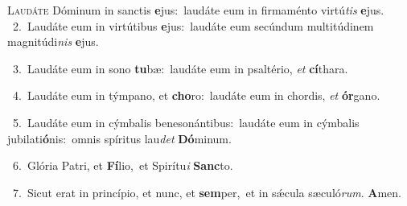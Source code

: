 \lettrine{\initial\textcolor{\initialcolor}{L}}{audáte} Dóminum in sanctis \textbf{e}\-jus:~\star laudáte eum in firmaménto virtú\textit{tis} \textbf{e}\-jus.\\
{\numbfont\textcolor{\numbcolor}{~2.}}~Laudáte eum in virtútibus \textbf{e}\-jus:~\star laudáte eum secúndum multitúdinem magnitúdi\textit{nis} \textbf{e}\-jus.\par
{\numbfont\textcolor{\numbcolor}{~3.}}~Laudáte eum in sono \textbf{tu}\-bæ:~\star laudáte eum in psaltério, \textit{et} \textbf{cí}\-thara.\par
{\numbfont\textcolor{\numbcolor}{~4.}}~Laudáte eum in týmpano, et \textbf{cho}\-ro:~\star laudáte eum in chordis, \textit{et} \textbf{ór}\-gano.\par
{\numbfont\textcolor{\numbcolor}{~5.}}~Laudáte eum in cýmbalis benesonántibus:~\dagger laudáte eum in cýmbalis jubilati\-\textbf{ó}\-nis:~\star omnis spíritus lau\textit{det} \textbf{Dó}\-minum.\par
{\numbfont\textcolor{\numbcolor}{~6.}}~Glória Patri, et \textbf{Fí}\-lio,~\star et Spirítu\textit{i} \textbf{Sanc}\-to.\par
{\numbfont\textcolor{\numbcolor}{~7.}}~Sicut erat in princípio, et nunc, et \textbf{sem}\-per,~\star et in sǽcula sæculó\-\textit{rum}\-. \textbf{A}\-men.\par
